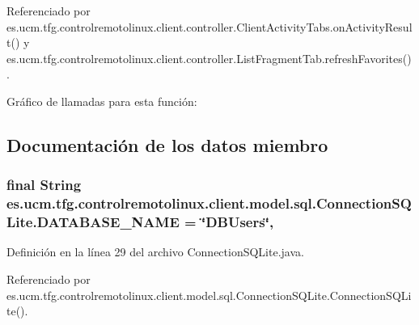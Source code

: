 Referenciado por es.\-ucm.\-tfg.\-controlremotolinux.\-client.\-controller.\-Client\-Activity\-Tabs.\-on\-Activity\-Result() y es.\-ucm.\-tfg.\-controlremotolinux.\-client.\-controller.\-List\-Fragment\-Tab.\-refresh\-Favorites().



Gráfico de llamadas para esta función\-:




\subsection{Documentación de los datos miembro}
\hypertarget{classes_1_1ucm_1_1tfg_1_1controlremotolinux_1_1client_1_1model_1_1sql_1_1ConnectionSQLite_adaf5a6ead9220b7de37d129e2717ae6d}{
\subsubsection[{D\-A\-T\-A\-B\-A\-S\-E\-\_\-\-N\-A\-M\-E}]{\setlength{\rightskip}{0pt plus 5cm}final String es.\-ucm.\-tfg.\-controlremotolinux.\-client.\-model.\-sql.\-Connection\-S\-Q\-Lite.\-D\-A\-T\-A\-B\-A\-S\-E\-\_\-\-N\-A\-M\-E = \char`\"{}D\-B\-Users\char`\"{}\hspace{0.3cm}{\ttfamily [static]}, {\ttfamily [private]}}}\label{classes_1_1ucm_1_1tfg_1_1controlremotolinux_1_1client_1_1model_1_1sql_1_1ConnectionSQLite_adaf5a6ead9220b7de37d129e2717ae6d}


Definición en la línea 29 del archivo Connection\-S\-Q\-Lite.\-java.



Referenciado por es.\-ucm.\-tfg.\-controlremotolinux.\-client.\-model.\-sql.\-Connection\-S\-Q\-Lite.\-Connection\-S\-Q\-Lite().

